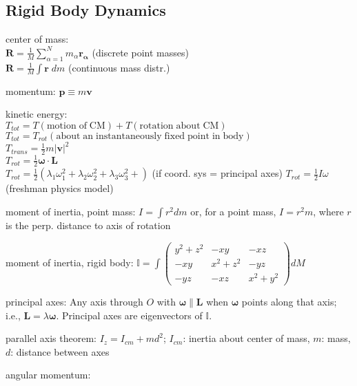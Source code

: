 \documentclass[letterpaper,landscape,10pt]{article}
\newenvironment{mydescription}
{\begin{description}
	\setlength{\itemsep}{0pt}
	\setlength{\parskip}{0pt}
	\setlength{\parsep}{-1pt}}
{\end{description}}
\begin{document}
{\begin{multicols}{3}
	\subsection*{Rigid Body Dynamics}
		\begin{mydescription}
		  	\item[center of mass:] \ \\
			  $\bm{R} = \frac{1}{M}\sum_{\alpha=1}^Nm_\alpha\bm{r_\alpha}$ (discrete point masses)\\
			  $\bm{R} = \frac{1}{M}\int\bm{r}\; dm$ (continuous mass distr.)
			\item[momentum:] $\bm{p}\equiv m\bm{v}$
			\item[kinetic energy:] \ \\
			  $T_{tot} = T\mathrm{(motion\;of\;CM)}+T\mathrm{(rotation\;about\;CM)}$ \\
			  $T_{tot} = T_{rot}\mathrm{(about\;an\;instantaneously\;fixed\;point\;in\;body)}$ \\
	    	  $T_{trans} = \frac{1}{2}m|\bm{v}|^2$  \\
			  $T_{rot} = \frac{1}{2}\bm{\omega}\cdot\bm{L}$ \\
			  $T_{rot} = \frac{1}{2}\left( \lambda_1\omega_1^2 +
			  \lambda_2\omega_2^2 +  \lambda_3\omega_3^2 + \right)$ (if coord.
			  sys = principal axes)
			  $T_{rot} = \frac{1}{2}I\omega$ (freshman physics model)
			\item[moment of inertia, point mass:]
				$I = \int r^2dm$ or, for a point mass, $I = r^2m$, where $r$ is
				the perp. distance to axis of rotation  \\
			\item[moment of inertia, rigid body:]
			  $\mathbb{I} = \int \begin{pmatrix} y^2+z^2 & -xy & -xz \\ -xy &
				x^2+z^2 & -yz \\ -yz & -xz & x^2+y^2 \end{pmatrix} dM $ \\
			  \item[principal axes:] Any axis through $O$ with
				$\bm{\omega}\parallel\bm{L}$ when $\bm{\omega}$
				points along that axis; i.e.,
				$\bm{L}=\lambda\bm{\omega}$. Principal axes are
				eigenvectors of $\mathbb{I}$. \\
			\item[parallel axis theorem:]
				$I_z=I_{cm}+md^2$; $I_{cm}$: inertia about center of mass, $m$:
				mass, $d$: distance between axes  \\
			\item[angular momentum:] \ \\

\end{mydescription}
\end{multicols}}
\end{document}
